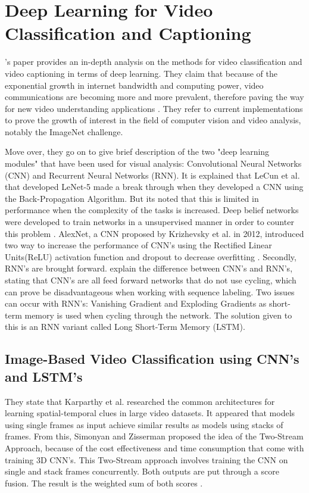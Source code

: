 \section{Deep Learning for Video Classification and Captioning}
\citeauthor{Wu}'s paper provides an in-depth analysis on the methods for video classification and video captioning in terms of deep learning. They claim that because of the exponential growth in internet bandwidth and computing power, video communications are becoming more and more prevalent, therefore paving the way for new video understanding applications \citep{Wu}. They refer to current implementations to prove the growth of interest in the field of computer vision and video analysis, notably the ImageNet challenge. 

Move over, they go on to give brief description of the two "deep learning modules" that have been used for visual analysis: Convolutional Neural Networks (CNN) and Recurrent Neural Networks (RNN). It is explained that LeCun et al. that developed LeNet-5 made a break through when they developed a CNN using the Back-Propagation Algorithm. But its noted that this is limited in performance when the complexity of the tasks is increased. Deep belief networks were developed to train networks in a unsupervised manner in order to counter this problem \citep{Wu}. AlexNet, a CNN proposed by Krizhevsky et al. in 2012, introduced two way to increase the performance of CNN's using the Rectified Linear Units(ReLU) activation function and dropout to decrease overfitting \citep{Wu}. Secondly, RNN's are brought forward. \citeauthor{Wu} explain the difference between CNN's and RNN's, stating that CNN's are all feed forward networks that do not use cycling, which can prove be disadvantageous when working with sequence labeling. Two issues can occur with RNN's: Vanishing Gradient and Exploding Gradients as short-term memory is used when cycling through the network. The solution given to this is an RNN variant called Long Short-Term Memory (LSTM). \\
\subsection{Image-Based Video Classification using CNN's and LSTM's}
They state that  Karparthy et al. researched the common architectures for learning spatial-temporal clues in large video datasets. It appeared that models using single frames as input achieve similar results as models using stacks of frames. From this, Simonyan and Zisserman proposed the idea of the Two-Stream Approach, because of the cost effectiveness and time consumption that come with training 3D CNN's. This Two-Stream approach involves training the CNN on single and stack frames concurrently. Both outputs are put through a score fusion. The result is the weighted sum of both scores \citep{Wu}. 

